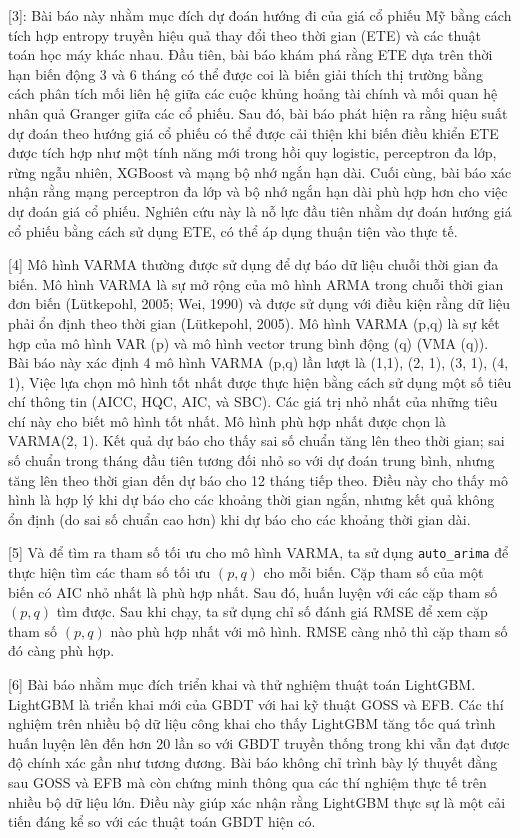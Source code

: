 \documentclass[conference]{IEEEtran}
\begin{document}
[3]: Bài báo này nhằm mục đích dự đoán hướng đi của giá cổ phiếu Mỹ bằng cách tích hợp entropy truyền hiệu quả thay đổi theo thời gian (ETE) và các thuật toán học máy khác nhau. Đầu tiên, bài báo khám phá rằng ETE dựa trên thời hạn biến động 3 và 6 tháng có thể được coi là biến giải thích thị trường bằng cách phân tích mối liên hệ giữa các cuộc khủng hoảng tài chính và mối quan hệ nhân quả Granger giữa các cổ phiếu. Sau đó, bài báo phát hiện ra rằng hiệu suất dự đoán theo hướng giá cổ phiếu có thể được cải thiện khi biến điều khiển ETE được tích hợp như một tính năng mới trong hồi quy logistic, perceptron đa lớp, rừng ngẫu nhiên, XGBoost và mạng bộ nhớ ngắn hạn dài. Cuối cùng, bài báo xác nhận rằng mạng perceptron đa lớp và bộ nhớ ngắn hạn dài phù hợp hơn cho việc dự đoán giá cổ phiếu. Nghiên cứu này là nỗ lực đầu tiên nhằm dự đoán hướng giá cổ phiếu bằng cách sử dụng ETE, có thể áp dụng thuận tiện vào thực tế.

[4] Mô hình VARMA thường được sử dụng để dự báo dữ liệu chuỗi thời gian đa biến. Mô hình VARMA là sự mở rộng của mô hình ARMA trong chuỗi thời gian đơn biến (Lütkepohl, 2005; Wei, 1990) và được sử dụng với điều kiện rằng dữ liệu phải ổn định theo thời gian (Lütkepohl, 2005). Mô hình VARMA (p,q) là sự kết hợp của mô hình VAR (p) và mô hình vector trung bình động (q) (VMA (q)). Bài báo này xác định 4 mô hình VARMA (p,q) lần lượt là (1,1), (2, 1), (3, 1), (4, 1), Việc lựa chọn mô hình tốt nhất được thực hiện bằng cách sử dụng một số tiêu chí thông tin (AICC, HQC, AIC, và SBC). Các giá trị nhỏ nhất của những tiêu chí này cho biết mô hình tốt nhất. Mô hình phù hợp nhất được chọn là VARMA(2, 1). Kết quả dự báo cho thấy sai số chuẩn tăng lên theo thời gian; sai số chuẩn trong tháng đầu tiên tương đối nhỏ so với dự đoán trung bình, nhưng tăng lên theo thời gian đến dự báo cho 12 tháng tiếp theo. Điều này cho thấy mô hình là hợp lý khi dự báo cho các khoảng thời gian ngắn, nhưng kết quả không ổn định (do sai số chuẩn cao hơn) khi dự báo cho các khoảng thời gian dài.

[5] Và để tìm ra tham số tối ưu cho mô hình VARMA, ta sử dụng \texttt{auto\_arima} để thực hiện tìm các tham số tối ưu $(p, q)$ cho mỗi biến. Cặp tham số của một biến có AIC nhỏ nhất là phù hợp nhất. Sau đó, huấn luyện với các cặp tham số $(p, q)$ tìm được. Sau khi chạy, ta sử dụng chỉ số đánh giá RMSE để xem cặp tham số $(p, q)$ nào phù hợp nhất với mô hình. RMSE càng nhỏ thì cặp tham số đó càng phù hợp.

[6] Bài báo nhằm mục đích triển khai và thử nghiệm thuật toán LightGBM. LightGBM là triển khai mới của GBDT với hai kỹ thuật GOSS và EFB. Các thí nghiệm trên nhiều bộ dữ liệu công khai cho thấy LightGBM tăng tốc quá trình huấn luyện lên đến hơn 20 lần so với GBDT truyền thống trong khi vẫn đạt được độ chính xác gần như tương đương. Bài báo không chỉ trình bày lý thuyết đằng sau GOSS và EFB mà còn chứng minh thông qua các thí nghiệm thực tế trên nhiều bộ dữ liệu lớn. Điều này giúp xác nhận rằng LightGBM thực sự là một cải tiến đáng kể so với các thuật toán GBDT hiện có.
\end{document}
